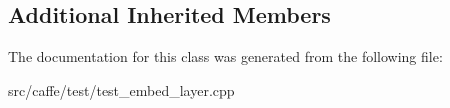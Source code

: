 \subsection*{Additional Inherited Members}


The documentation for this class was generated from the following file\+:\begin{DoxyCompactItemize}
\item 
src/caffe/test/test\+\_\+embed\+\_\+layer.\+cpp\end{DoxyCompactItemize}
